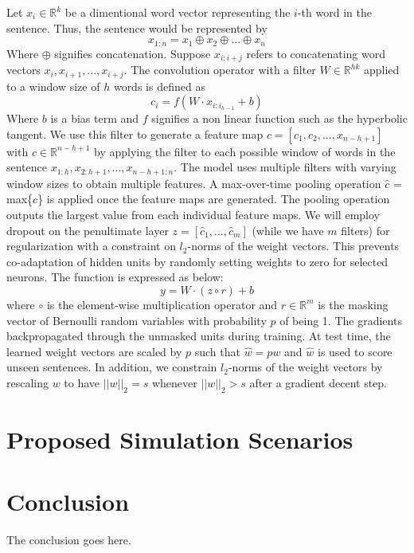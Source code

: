\documentclass[conference]{IEEEtran}
\begin{document}
 Let $x_{i} \in \mathbb{R}^k$ be a dimentional word vector representing the $i$-th word in the 
 sentence. Thus, the sentence would be represented by 
 \begin{equation}
 x_{1:n} = x_1 \oplus x_2 \oplus ... \oplus x_n
 \end{equation}
 Where $\oplus$ signifies concatenation. Suppose $x_{i:i+j}$ refers to concatenating 
 word vectors $x_i, x_{i+1}, ... , x_{i+j}$. The convolution operator with a filter $W \in \mathbb{R}^{hk}$ applied to a window size of $h$ 
 words is defined as 
 \begin{equation}
 c_i = f(W \cdot x_{i:i_{h-1}} + b)
 \end{equation}
 Where $b$ is a bias term and $f$ signifies a non linear function such as the hyperbolic tangent. We use this
 filter to generate a feature map $c = [c_1, c_2, ... ,x_{n-h+1}]$ with $c \in \mathbb{R}^{n-h+1}$ by applying the filter to each possible window of words in the sentence $x_{1:h}, x_{2:h+1}, ... ,x_{n-h+1:n}$. 
 The model uses multiple filters with varying window sizes to obtain multiple features. 
 A max-over-time pooling operation $\hat{c}$ = max\{$c$\} is applied once the feature maps are generated. 
 The pooling operation outputs the largest value from each individual feature maps. 
 We will employ dropout on the penultimate layer $z = [\hat{c}_1,...,\hat{c}_m]$ (while we have $m$ filters) for regularization with a constraint on $l_2$-norms of the weight vectors. This prevents co-adaptation of hidden units by randomly setting weights to zero for selected neurons.  The function is expressed as below: 
 \begin{equation}
 y = W \cdot (z \circ r) + b
 \end{equation}
where $\circ$ is the element-wise multiplication operator and $r \in \mathbb{R}^m$ is the masking vector of Bernoulli random variables 
with probability $p$ of being 1. The gradients backpropagated through the unmasked units during training. At test time, the learned weight vectors are scaled by $p$ such that $\hat{w} = pw$ and $\hat{w}$ is used to score unseen sentences. 
In addition, we constrain $l_2$-norms of the weight vectors by rescaling $w$ to have $||w||_2 = s$ whenever $||w||_2 > s$ after a gradient decent step. 

\section{Proposed Simulation Scenarios}

\section{Conclusion}
The conclusion goes here.



\end{document}

